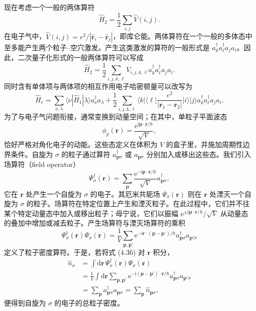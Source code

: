 现在考虑一个一般的两体算符
\begin{equation*}
\widehat{H}_2=\frac{1}{2}\sum_{i,j}\widehat{V}(i,j).
\tag{4.31}
\end{equation*}
在电子气中，$\widehat{V}(i,j)=e^2/|\widehat{\mathbf{r}}_i-\widehat{\mathbf{r}}_j|$，即库仑能。两体算符在一个一般的多体态中至多能产生两个粒子–空穴激发。产生这类激发的算符的一般形式是 $a_k^\dagger a_\ell^\dagger a_j a_i$。因此，二次量子化形式的一般两体算符可以写成
\begin{equation*}
\widehat{H}_2=\frac{1}{2}\sum_{i,j,k,\ell}V_{i,j,k,\ell}a_k^\dagger a_\ell^\dagger a_j a_i.
\tag{4.32}
\end{equation*}
同时含有单体项与两体项的相互作用电子哈密顿量可以改写为
\begin{equation*}
\widehat{H}_e=\sum_{\nu,\lambda}\langle\nu|\widehat{H}_1|\lambda\rangle a_\nu^\dagger a_\lambda+\frac{1}{2}\sum_{i,j,k,\ell}\langle k|\langle\ell|\frac{e^2}{|\mathbf{r}_1-\mathbf{r}_2|}|i\rangle|j\rangle a_k^\dagger a_\ell^\dagger a_j a_i.
\tag{4.33}
\end{equation*}
为了与电子气问题衔接，通常变换到动量空间；在其中，单粒子平面波态
\begin{equation*}
\phi_p(\mathbf{r})=\frac{\mathrm{e}^{\mathrm{i}\mathbf{p}\cdot\mathbf{r}/\hbar}}{\sqrt{V}},
\tag{4.34}
\end{equation*}
恰好严格对角化电子的动能。这些态定义在体积为 $V$ 的盒子里，并施加周期性边界条件。自旋为 $\sigma$ 的粒子通过算符 $a_{\mathbf{p}\sigma}^\dagger$ 或 $a_{\mathbf{p}\sigma}$ 分别加入或移出这些态。我们引入场算符（field operator）
\begin{equation*}
\Psi_\sigma^\dagger(\mathbf{r})=\sum_{\mathbf{p}}\frac{\mathrm{e}^{-\mathrm{i}\mathbf{p}\cdot\mathbf{r}/\hbar}}{\sqrt{V}}a_{\mathbf{p}\sigma}^\dagger,
\tag{4.35}
\end{equation*}
它在 $\mathbf{r}$ 处产生一个自旋为 $\sigma$ 的电子。其厄米共轭场 $\Psi_\sigma(\mathbf{r})$ 则在 $\mathbf{r}$ 处湮灭一个自旋为 $\sigma$ 的粒子。场算符在特定位置上产生和湮灭粒子。在此过程中，它们并不往某个特定动量态中加入或移出粒子；毋宁说，它们以振幅 $\mathrm{e}^{\pm\mathrm{i}\mathbf{p}\cdot\mathbf{r}/\hbar}/\sqrt{V}$ 从动量态的叠加中增加或减去粒子。产生场算符与湮灭场算符的乘积
\begin{equation*}
\Psi_\sigma^\dagger(\mathbf{r})\Psi_\sigma(\mathbf{r})=\frac{1}{V}\sum_{\mathbf{p},\mathbf{p}'}\mathrm{e}^{-\mathrm{i}\mathbf{r}\cdot(\mathbf{p}-\mathbf{p}')/\hbar}a_{\mathbf{p}\sigma}^\dagger a_{\mathbf{p}'\sigma}
\tag{4.36}
\end{equation*}
定义了粒子密度算符。于是，若将式 (4.36) 对 $\mathbf{r}$ 积分，
\begin{align*}
\widehat{n}_\sigma &= \int\mathrm{d}\mathbf{r}\,\Psi_\sigma^\dagger(\mathbf{r})\Psi_\sigma(\mathbf{r}) \\
&= \frac{1}{V}\int\mathrm{d}\mathbf{r}\sum_{\mathbf{p},\mathbf{p}'}\mathrm{e}^{-\mathrm{i}(\mathbf{p}-\mathbf{p}')\cdot\mathbf{r}/\hbar}a_{\mathbf{p}\sigma}^\dagger a_{\mathbf{p}'\sigma} \\
&= \sum_{\mathbf{p}}a_{\mathbf{p}\sigma}^\dagger a_{\mathbf{p}\sigma}=\sum_{\mathbf{p}}\widehat{n}_{\mathbf{p}\sigma},
\tag{4.37}
\end{align*}
便得到自旋为 $\sigma$ 的电子的总粒子密度。

